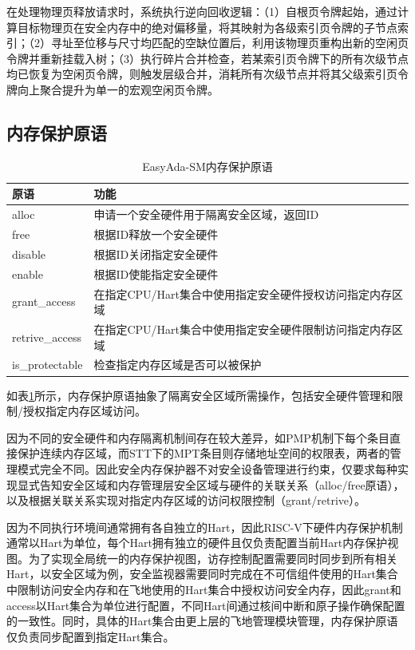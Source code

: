 \documentclass[master, vlined, review]{DissertUESTC}
\begin{document}
	在处理物理页释放请求时，系统执行逆向回收逻辑：（1）自根页令牌起始，通过计算目标物理页在安全内存中的绝对偏移量，将其映射为各级索引页令牌的子节点索引；（2）寻址至位移与尺寸均匹配的空缺位置后，利用该物理页重构出新的空闲页令牌并重新挂载入树；（3）执行碎片合并检查，若某索引页令牌下的所有次级节点均已恢复为空闲页令牌，则触发层级合并，消耗所有次级节点并将其父级索引页令牌向上聚合提升为单一的宏观空闲页令牌。
	
	\subsection{内存保护原语}
	\begin{table}[!ht]
		\caption{EasyAda-SM内存保护原语}
		\label{mempro}
		\begin{tabular}{p{3cm} <{\centering} p{10cm}<{\centering}}
			\toprule
			原语 & 功能 \\
			\midrule
			alloc & 申请一个安全硬件用于隔离安全区域，返回ID \\
			free & 根据ID释放一个安全硬件 \\
			disable & 根据ID关闭指定安全硬件 \\
			enable & 根据ID使能指定安全硬件 \\
			grant\_access & 在指定CPU/Hart集合中使用指定安全硬件授权访问指定内存区域 \\
			retrive\_access & 在指定CPU/Hart集合中使用指定安全硬件限制访问指定内存区域 \\
			is\_protectable & 检查指定内存区域是否可以被保护 \\
			\bottomrule
		\end{tabular}
	\end{table}
	如表\ref{mempro}所示，内存保护原语抽象了隔离安全区域所需操作，包括安全硬件管理和限制/授权指定内存区域访问。
	
	因为不同的安全硬件和内存隔离机制间存在较大差异，如PMP机制下每个条目直接保护连续内存区域，而STT下的MPT条目则存储地址空间的权限表，两者的管理模式完全不同。因此安全内存保护器不对安全设备管理进行约束，仅要求每种实现显式告知安全区域和内存管理层安全区域与硬件的关联关系（alloc/free原语），以及根据关联关系实现对指定内存区域的访问权限控制（grant/retrive）。
	
	因为不同执行环境间通常拥有各自独立的Hart，因此RISC-V下硬件内存保护机制通常以Hart为单位，每个Hart拥有独立的硬件且仅负责配置当前Hart内存保护视图。为了实现全局统一的内存保护视图，访存控制配置需要同时同步到所有相关Hart，以安全区域为例，安全监视器需要同时完成在不可信组件使用的Hart集合中限制访问安全内存和在飞地使用的Hart集合中授权访问安全内存，因此grant和access以Hart集合为单位进行配置，不同Hart间通过核间中断和原子操作确保配置的一致性。同时，具体的Hart集合由更上层的飞地管理模块管理，内存保护原语仅负责同步配置到指定Hart集合。
	
\end{document}
